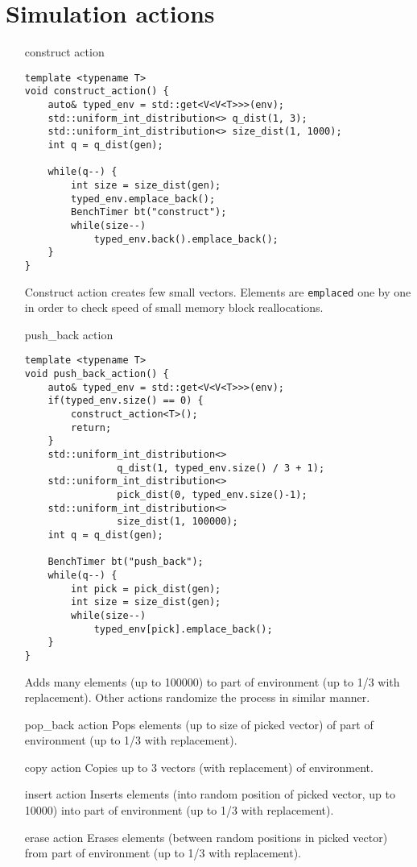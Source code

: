 \documentclass[inz, english, shortabstract]{iithesis}
\begin{document}
\clearpage
\section{Simulation actions}
\begin{itemize}
\item [construct action]
\begin{lstlisting}[caption=construct action]
template <typename T>
void construct_action() {
	auto& typed_env = std::get<V<V<T>>>(env);
	std::uniform_int_distribution<> q_dist(1, 3);
	std::uniform_int_distribution<> size_dist(1, 1000);
	int q = q_dist(gen);
	
	while(q--) {
		int size = size_dist(gen);
		typed_env.emplace_back();
		BenchTimer bt("construct");
		while(size--)
			typed_env.back().emplace_back();
	}
}
\end{lstlisting}
Construct action creates few small vectors. Elements are {\tt emplaced} one by one in order to check speed of small memory block reallocations. 

\item [push\_back action]
\begin{lstlisting}[caption=push\_back action]
template <typename T>
void push_back_action() {
	auto& typed_env = std::get<V<V<T>>>(env);
	if(typed_env.size() == 0) {
		construct_action<T>();
		return;
	}
	std::uniform_int_distribution<> 
				q_dist(1, typed_env.size() / 3 + 1);
	std::uniform_int_distribution<> 
				pick_dist(0, typed_env.size()-1);
	std::uniform_int_distribution<> 
				size_dist(1, 100000);
	int q = q_dist(gen);
	
	BenchTimer bt("push_back");
	while(q--) {
		int pick = pick_dist(gen);
		int size = size_dist(gen);
		while(size--)
			typed_env[pick].emplace_back();
	}
}
\end{lstlisting}
Adds many elements (up to 100000) to part of environment (up to 1/3 with replacement). Other actions randomize the process in similar manner.

\item [pop\_back action]
Pops elements (up to size of picked vector) of part of environment (up to 1/3 with replacement). 

\item [copy action]
Copies up to 3 vectors (with replacement) of environment.

\item[insert action]
Inserts elements (into random position of picked vector, up to 10000) into part of environment (up to 1/3 with replacement).

\item[erase action]
Erases elements (between random positions in picked vector) from part of environment (up to 1/3 with replacement).
\end{itemize}
\end{document}
